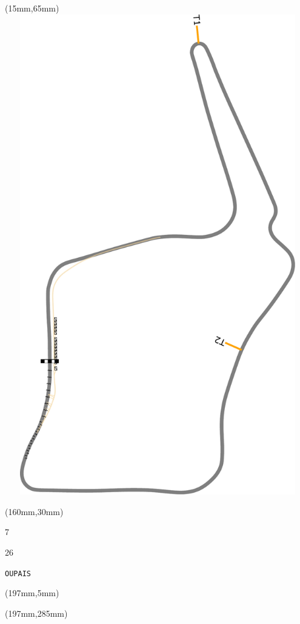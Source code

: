 \begin{textblock*}{185mm}(15mm,65mm)%
\centering
\mbox{\includegraphics[width=185mm,height=210mm,keepaspectratio]{PT/OUPAIS.pdf}}
\end{textblock*}
\begin{textblock*}{40mm}(160mm,30mm)%
\Large
\par{} 
\par7 
\par26 
\par\hfill\tiny\tt OUPAIS\\
\end{textblock*}
\begin{textblock*}{20mm}(197mm,5mm)%
\fbox{\thepage}
\label{OUPAIS}
\end{textblock*}
\begin{textblock*}{20mm}(197mm,285mm)%
\fbox{\thepage}
\end{textblock*}

